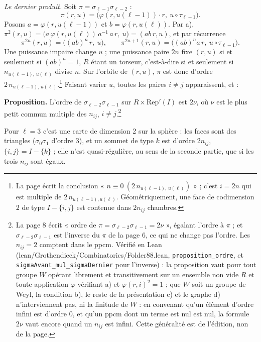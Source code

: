 \documentclass[11pt,a4paper]{article}
\begin{document}
\emph{Le dernier produit.} Soit $\pi = \sigma_{\ell-1}\sigma_{\ell-2}$ :
\[
  \pi(r, u) = \bigl(\varphi(r, u(\ell - 1)) \cdot r,\ u \circ \tau_{\ell-1}\bigr).
\]
Posons $a = \varphi(r, u(\ell-1))$ et $b = \varphi(r, u(\ell))$. Par a),
$\pi^{2}(r,u) = \bigl(a\,\varphi(r,u(\ell))\,a^{-1}\,a\,r,\ u\bigr) = (ab\,r, u)$,
et par récurrence
\[
  \pi^{2n}(r, u) = \bigl((ab)^{n}\, r,\ u\bigr),
  \qquad
  \pi^{2n+1}(r, u) = \bigl((ab)^{n} a\, r,\ u \circ \tau_{\ell-1}\bigr).
\]
Une puissance impaire change $u$ ; une puissance paire $2n$ fixe $(r, u)$ si et
seulement si $(ab)^{n} = 1$, $R$ étant un torseur, c'est-à-dire si et seulement
si $n_{u(\ell-1),\,u(\ell)}$ divise $n$. Sur l'orbite de $(r,u)$, $\pi$ est donc
d'ordre $2\,n_{u(\ell-1),\,u(\ell)}$.\footnote{La page écrit la conclusion
« $n \equiv 0\ (2\,n_{u(\ell-1),\,u(\ell)})$ » ; c'est $i = 2n$ qui est
multiple de $2\,n_{u(\ell-1),u(\ell)}$. Géométriquement, une face de
codimension 2 de type $I - \{i,j\}$ est contenue dans $2n_{ij}$ chambres.}
Faisant varier $u$, toutes les paires $i \neq j$ apparaissent, et :

\textbf{Proposition.} L'ordre de $\sigma_{\ell-2}\sigma_{\ell-1}$ sur
$R \times \mathrm{Rep}'(I)$ est $2\nu$, où $\nu$ est le plus petit commun
multiple des $n_{ij}$, $i \neq j$.\footnote{La page 8 écrit « ordre de
$\pi = \sigma_{\ell-2}\sigma_{\ell-1} = 2\nu$ », égalant l'ordre à $\pi$ ; et
$\sigma_{\ell-2}\sigma_{\ell-1}$ est l'inverse du $\pi$ de la page 6, ce qui
ne change pas l'ordre. Les $n_{ij} = 2$ comptent dans le ppcm. Vérifié en
Lean (lean/Grothendieck/Combinatorics/Folder88.lean, \texttt{proposition\_ordre}, et
\texttt{sigmaAvant\_mul\_sigmaDernier} pour l'inverse) : la proposition vaut
pour tout groupe $W$ opérant librement et transitivement sur un ensemble non
vide $R$ et toute application $\varphi$ vérifiant a) et
$\varphi(r,i)^{2} = 1$ ; que $W$ soit un groupe de Weyl, la condition b), le
reste de la présentation c) et le graphe d) n'interviennent pas, ni la
finitude de $W$ : en convenant qu'un élément d'ordre infini est d'ordre $0$,
et qu'un ppcm dont un terme est nul est nul, la formule $2\nu$ vaut encore
quand un $n_{ij}$ est infini. Cette généralité est de l'édition, non de la
page.}

Pour $\ell = 3$ c'est une carte de dimension 2 sur la sphère : les faces sont
des triangles ($\sigma_{0}\sigma_{1}$ d'ordre 3), et un sommet de type $k$ est
d'ordre $2 n_{ij}$, $\{i, j\} = I - \{k\}$ ; elle n'est quasi-régulière, au
sens de la seconde partie, que si les trois $n_{ij}$ sont égaux.
\end{document}
